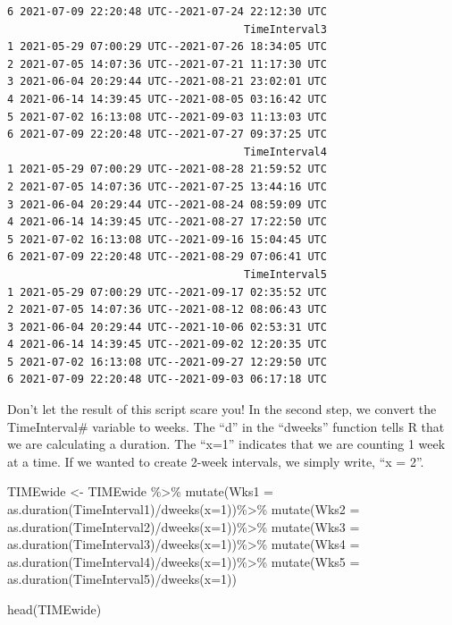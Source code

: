 \documentclass[
  11pt,
]{book}
\newenvironment{Shaded}{\begin{snugshade}}{\end{snugshade}}
\newcommand{\AttributeTok}[1]{\textcolor[rgb]{0.77,0.63,0.00}{#1}}
\newcommand{\DecValTok}[1]{\textcolor[rgb]{0.00,0.00,0.81}{#1}}
\newcommand{\FunctionTok}[1]{\textcolor[rgb]{0.00,0.00,0.00}{#1}}
\newcommand{\NormalTok}[1]{#1}
\newcommand{\OtherTok}[1]{\textcolor[rgb]{0.56,0.35,0.01}{#1}}
\newcommand{\SpecialCharTok}[1]{\textcolor[rgb]{0.00,0.00,0.00}{#1}}
\begin{document}
\begin{verbatim}
6 2021-07-09 22:20:48 UTC--2021-07-24 22:12:30 UTC
                                     TimeInterval3
1 2021-05-29 07:00:29 UTC--2021-07-26 18:34:05 UTC
2 2021-07-05 14:07:36 UTC--2021-07-21 11:17:30 UTC
3 2021-06-04 20:29:44 UTC--2021-08-21 23:02:01 UTC
4 2021-06-14 14:39:45 UTC--2021-08-05 03:16:42 UTC
5 2021-07-02 16:13:08 UTC--2021-09-03 11:13:03 UTC
6 2021-07-09 22:20:48 UTC--2021-07-27 09:37:25 UTC
                                     TimeInterval4
1 2021-05-29 07:00:29 UTC--2021-08-28 21:59:52 UTC
2 2021-07-05 14:07:36 UTC--2021-07-25 13:44:16 UTC
3 2021-06-04 20:29:44 UTC--2021-08-24 08:59:09 UTC
4 2021-06-14 14:39:45 UTC--2021-08-27 17:22:50 UTC
5 2021-07-02 16:13:08 UTC--2021-09-16 15:04:45 UTC
6 2021-07-09 22:20:48 UTC--2021-08-29 07:06:41 UTC
                                     TimeInterval5
1 2021-05-29 07:00:29 UTC--2021-09-17 02:35:52 UTC
2 2021-07-05 14:07:36 UTC--2021-08-12 08:06:43 UTC
3 2021-06-04 20:29:44 UTC--2021-10-06 02:53:31 UTC
4 2021-06-14 14:39:45 UTC--2021-09-02 12:20:35 UTC
5 2021-07-02 16:13:08 UTC--2021-09-27 12:29:50 UTC
6 2021-07-09 22:20:48 UTC--2021-09-03 06:17:18 UTC
\end{verbatim}

Don't let the result of this script scare you! In the second step, we convert the TimeInterval\# variable to weeks. The ``d'' in the ``dweeks'' function tells R that we are calculating a duration. The ``x=1'' indicates that we are counting 1 week at a time. If we wanted to create 2-week intervals, we simply write, ``x = 2''.

\begin{Shaded}
\begin{Highlighting}[]
\NormalTok{TIMEwide }\OtherTok{\textless{}{-}}\NormalTok{ TIMEwide }\SpecialCharTok{\%\textgreater{}\%}
  \FunctionTok{mutate}\NormalTok{(}\AttributeTok{Wks1 =} \FunctionTok{as.duration}\NormalTok{(TimeInterval1)}\SpecialCharTok{/}\FunctionTok{dweeks}\NormalTok{(}\AttributeTok{x=}\DecValTok{1}\NormalTok{))}\SpecialCharTok{\%\textgreater{}\%}
  \FunctionTok{mutate}\NormalTok{(}\AttributeTok{Wks2 =} \FunctionTok{as.duration}\NormalTok{(TimeInterval2)}\SpecialCharTok{/}\FunctionTok{dweeks}\NormalTok{(}\AttributeTok{x=}\DecValTok{1}\NormalTok{))}\SpecialCharTok{\%\textgreater{}\%}
  \FunctionTok{mutate}\NormalTok{(}\AttributeTok{Wks3 =} \FunctionTok{as.duration}\NormalTok{(TimeInterval3)}\SpecialCharTok{/}\FunctionTok{dweeks}\NormalTok{(}\AttributeTok{x=}\DecValTok{1}\NormalTok{))}\SpecialCharTok{\%\textgreater{}\%}
  \FunctionTok{mutate}\NormalTok{(}\AttributeTok{Wks4 =} \FunctionTok{as.duration}\NormalTok{(TimeInterval4)}\SpecialCharTok{/}\FunctionTok{dweeks}\NormalTok{(}\AttributeTok{x=}\DecValTok{1}\NormalTok{))}\SpecialCharTok{\%\textgreater{}\%}
  \FunctionTok{mutate}\NormalTok{(}\AttributeTok{Wks5 =} \FunctionTok{as.duration}\NormalTok{(TimeInterval5)}\SpecialCharTok{/}\FunctionTok{dweeks}\NormalTok{(}\AttributeTok{x=}\DecValTok{1}\NormalTok{))}

\FunctionTok{head}\NormalTok{(TIMEwide)}
\end{Highlighting}
\end{Shaded}
\end{document}
